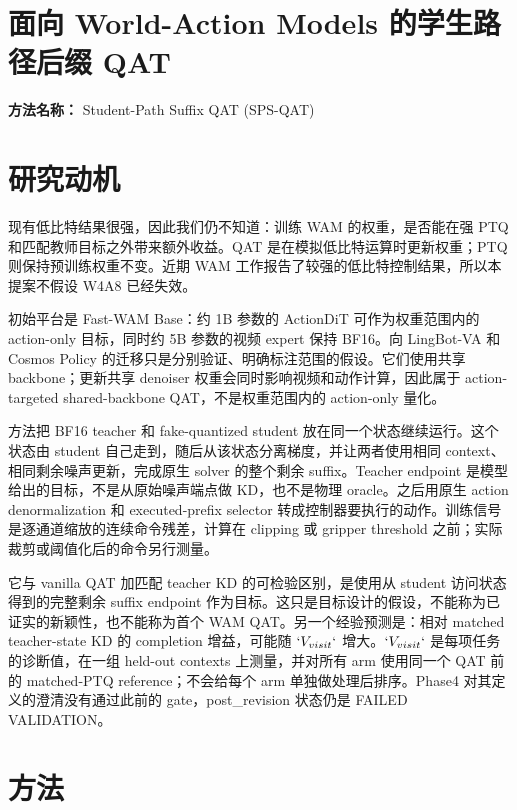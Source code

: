 \documentclass[10pt,a4paper]{article}
\begin{document}
\section*{面向 World-Action Models 的学生路径后缀 QAT}
\textbf{方法名称：} Student-Path Suffix QAT (SPS-QAT)
\section*{研究动机}
现有低比特结果很强，因此我们仍不知道：训练 WAM 的权重，是否能在强 PTQ 和匹配教师目标之外带来额外收益。QAT 是在模拟低比特运算时更新权重；PTQ 则保持预训练权重不变。近期 WAM 工作报告了较强的低比特控制结果，所以本提案不假设 W4A8 已经失效。

初始平台是 Fast-WAM Base：约 1B 参数的 ActionDiT 可作为权重范围内的 action-only 目标，同时约 5B 参数的视频 expert 保持 BF16。向 LingBot-VA 和 Cosmos Policy 的迁移只是分别验证、明确标注范围的假设。它们使用共享 backbone；更新共享 denoiser 权重会同时影响视频和动作计算，因此属于 action-targeted shared-backbone QAT，不是权重范围内的 action-only 量化。

方法把 BF16 teacher 和 fake-quantized student 放在同一个状态继续运行。这个状态由 student 自己走到，随后从该状态分离梯度，并让两者使用相同 context、相同剩余噪声更新，完成原生 solver 的整个剩余 suffix。Teacher endpoint 是模型给出的目标，不是从原始噪声端点做 KD，也不是物理 oracle。之后用原生 action denormalization 和 executed-prefix selector 转成控制器要执行的动作。训练信号是逐通道缩放的连续命令残差，计算在 clipping 或 gripper threshold 之前；实际裁剪或阈值化后的命令另行测量。

它与 vanilla QAT 加匹配 teacher KD 的可检验区别，是使用从 student 访问状态得到的完整剩余 suffix endpoint 作为目标。这只是目标设计的假设，不能称为已证实的新颖性，也不能称为首个 WAM QAT。另一个经验预测是：相对 matched teacher-state KD 的 completion 增益，可能随 \(`V_{visit}`\) 增大。\(`V_{visit}`\) 是每项任务的诊断值，在一组 held-out contexts 上测量，并对所有 arm 使用同一个 QAT 前的 matched-PTQ reference；不会给每个 arm 单独做处理后排序。Phase4 对其定义的澄清没有通过此前的 gate，post\_revision 状态仍是 FAILED VALIDATION。
\section*{方法}
\end{document}
